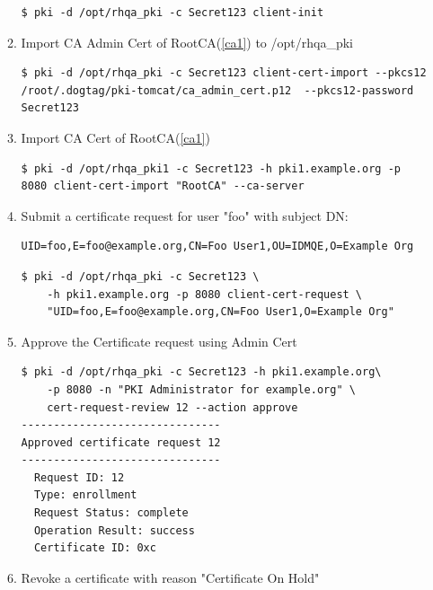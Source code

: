 \documentclass[a4paper]{article}
\begin{document}
\begin{enumerate}[label*=\arabic*.]
\begin{enumerate}[label*=\arabic*.]
\begin{lstlisting}[style=bashInputStyle]
$ pki -d /opt/rhqa_pki -c Secret123 client-init                                    
                    \end{lstlisting}
                \item \label{pki2} Import CA Admin Cert of RootCA(\ref{ca1}) to /opt/rhqa\_pki
                    \begin{lstlisting}[style=bashInputStyle]
$ pki -d /opt/rhqa_pki -c Secret123 client-cert-import --pkcs12 /root/.dogtag/pki-tomcat/ca_admin_cert.p12  --pkcs12-password Secret123                                    
                    \end{lstlisting}
                \item \label{pki3} Import CA Cert of RootCA(\ref{ca1})
                    \begin{lstlisting}[style=bashInputStyle]
$ pki -d /opt/rhqa_pki1 -c Secret123 -h pki1.example.org -p 8080 client-cert-import "RootCA" --ca-server                                    
                    \end{lstlisting}
                \item \label{pki4} Submit a certificate request for user "foo" with subject DN:
                    \begin{lstlisting}
UID=foo,E=foo@example.org,CN=Foo User1,OU=IDMQE,O=Example Org
                    \end{lstlisting}
                    \begin{lstlisting}[style=bashInputStyle]
$ pki -d /opt/rhqa_pki -c Secret123 \
    -h pki1.example.org -p 8080 client-cert-request \
    "UID=foo,E=foo@example.org,CN=Foo User1,O=Example Org" 
                    \end{lstlisting}
                \item \label{pki5} Approve the Certificate request using Admin Cert
                    \begin{lstlisting}[style=bashInputStyle]
$ pki -d /opt/rhqa_pki -c Secret123 -h pki1.example.org\
    -p 8080 -n "PKI Administrator for example.org" \
    cert-request-review 12 --action approve
-------------------------------
Approved certificate request 12
-------------------------------
  Request ID: 12
  Type: enrollment
  Request Status: complete
  Operation Result: success
  Certificate ID: 0xc
                    \end{lstlisting}
                \item Revoke a certificate with reason "Certificate On Hold"
                    \begin{lstlisting}[style=bashInputStyle]

\end{lstlisting}
\end{enumerate}
\end{enumerate}
\end{document}
